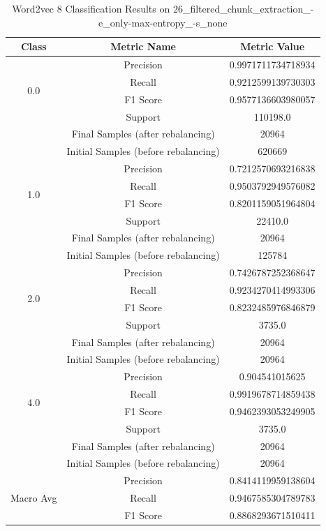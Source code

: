 \begin{longtable}{|c|c|c|}
\caption{Word2vec 8 Classification Results on 26\_filtered\_chunk\_extraction\_-e\_only-max-entropy\_-s\_none} \label{tab:26_filtered_chunk_extraction_-e_only-max-entropy_-s_none_word2vec_8_classifiers_results} \\
\hline
Class & Metric Name & Metric Value \\
\hline
\multirow{4}{*}{0.0} & Precision & 0.9971711734718934 \\
 & Recall & 0.9212599139730303 \\
 & F1 Score & 0.9577136603980057 \\
 & Support & 110198.0 \\
 & Final Samples (after rebalancing) & 20964 \\
 & Initial Samples (before rebalancing) & 620669 \\
\hline
\multirow{4}{*}{1.0} & Precision & 0.7212570693216838 \\
 & Recall & 0.9503792949576082 \\
 & F1 Score & 0.8201159051964804 \\
 & Support & 22410.0 \\
 & Final Samples (after rebalancing) & 20964 \\
 & Initial Samples (before rebalancing) & 125784 \\
\hline
\multirow{4}{*}{2.0} & Precision & 0.7426787252368647 \\
 & Recall & 0.9234270414993306 \\
 & F1 Score & 0.8232485976846879 \\
 & Support & 3735.0 \\
 & Final Samples (after rebalancing) & 20964 \\
 & Initial Samples (before rebalancing) & 20964 \\
\hline
\multirow{4}{*}{4.0} & Precision & 0.904541015625 \\
 & Recall & 0.9919678714859438 \\
 & F1 Score & 0.9462393053249905 \\
 & Support & 3735.0 \\
 & Final Samples (after rebalancing) & 20964 \\
 & Initial Samples (before rebalancing) & 20964 \\
\hline
\multirow{4}{*}{Macro Avg} & Precision & 0.8414119959138604 \\
 & Recall & 0.9467585304789783 \\
 & F1 Score & 0.8868293671510411 \\

\end{longtable}

